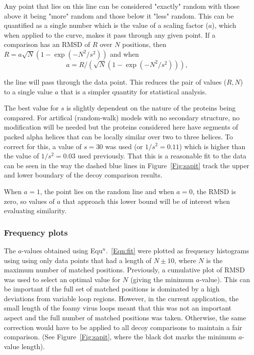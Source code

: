 \documentclass[preprint,12pt]{elsarticle}
\newcommand{\Fig}[1]{Figure~\ref{Fig:#1}}
\newcommand{\Eqn}[1]{Equ$^n$.~\ref{Eqn:#1}}
\begin{document}
Any point that lies on this line can be considered "exactly" random
with those above it being "more" random and those below it "less" random.  This can be quantified
as a single number which is the value of a scaling factor ($a$), which when applied to the curve, makes it
pass through any given point.   If a comparison has an RMSD of $R$ over $N$ positions, then
$R = a\surd N (1-\exp(-N^2/s^2))$ and when
\begin{equation}
\label{Eqn:fit}
a = R/(\surd N (1-\exp(-N^2/s^2))), 
\end{equation}

the line will pass through the data point.  This reduces the pair of values ($R,N$) to a
single value $a$ that is a simpler quantity for statistical analysis.

The best value for $s$ is slightly dependent on the nature of the proteins being compared.
For artifical (random-walk)  models with no secondary structure, no modification will be needed but the
proteins considered here have segments of packed alpha helices that can be locally similar
over two to three helices.   To correct for this, a value of $s=30$ was used (or $1/s^2 = 0.11$)
which is higher than the value of $1/s^2 = 0.03$ used previously.
That this is a reasonable fit to the data can be seen in the way the dashed blue lines
in \Fig{sapit} track the upper and lower boundary of the decoy comparison results.

When $a=1$, the point lies on the random line and when $a=0$, the RMSD is zero, so values of
$a$ that approach this lower bound will be of interest when evaluating similarity.

\subsubsection{Frequency plots}

The $a$-values obtained using \Eqn{fit} were plotted as frequency histograms using using
only data points that had a length of $N\pm 10$, where $N$ is the maximum number of matched
positions.   Previously, a cumulative plot of RMSD was used to select an optimal value for
$N$ (giving the minimum $a$-value).   This can be important if the full set of matched
positions is dominated by a high deviations from variable loop regions.   However, in the
current application, the small length of the foamy virus loops meant that this was not
an important aspect and the full number of matched positions was taken.   Otherwise, the
same correction would have to be applied to all decoy comparisons to maintain a fair
comparison.  (See \Fig{sapit}, where the black dot marks the minimum $a$-value length).
\end{document}
